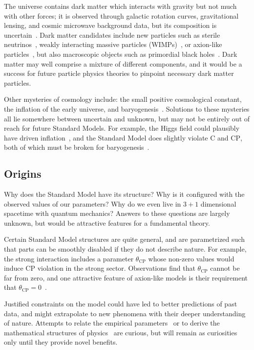 The universe contains dark matter which interacts with gravity but not much
with other forces; it is observed through galactic rotation curves,
gravitational lensing, and cosmic microwave background data,
but its composition is uncertain~\cite{
begeman1991rotation,
garrett2010dark,
planck2020results
}.
Dark matter candidates include new particles such as
sterile neutrinos~\cite{boyarsky2019sterile},
weakly interacting massive particles (WIMPs)~\cite{jungman1996wimp},
or
axion-like particles~\cite{kim2008axions},
but also macroscopic objects such as
primordial black holes~\cite{bernard2019primordial}.
Dark matter may well comprise a mixture of different components, and it would
be a success for future particle physics theories to pinpoint necessary dark
matter particles.

Other mysteries of cosmology include:
the small positive cosmological constant,
the inflation of the early universe,
and baryogenesis~\cite{
wells2020discovery,
riess1998observational
}.
Solutions to these mysteries all lie somewhere between uncertain and unknown,
but may not be entirely out of reach for future Standard Models.
For example, the Higgs field could plausibly have driven
inflation~\cite{bezrukov2008higgs},
and the Standard Model does slightly violate $\mathrm{C}$ and $\mathrm{CP}$,
both of which must be broken for baryogenesis~\cite{sakharov1991re}.


\subsection{Origins}
Why does the Standard Model have its structure?
Why is it configured with the observed values of our parameters?
Why do we even live in $3+1$ dimensional spacetime with quantum mechanics?
Answers to these questions are largely unknown, but would be
attractive features for a fundamental theory.

Certain Standard Model structures are quite general, and are parametrized such
that parts can be smoothly disabled if they do not describe nature.
For example, the strong interaction includes a parameter $\theta_\mathrm{CP}$
whose non-zero values would induce $\mathrm{CP}$ violation in the strong
sector.
Observations find that $\theta_\mathrm{CP}$ cannot be far from zero, and one
attractive feature of axion-like models is their requirement that
$\theta_\mathrm{CP} = 0$~\cite{
kim2008axions,
thomson2013modern,
martin2017particle
}.

Justified constraints on the model could have led to better predictions of
past data, and might extrapolate to new phenomena with their deeper
understanding of nature.
Attempts to relate the empirical parameters~\cite{
sato1979ratio,
beg1982gauge,
koide1983fermion,
denterria2012gaussian
}
or to derive the mathematical structures of physics~\cite{
goyal2010origin,
skilling2021abc,
axioms1010038
}
are curious, but will remain as curiosities only until they provide novel
benefits.


